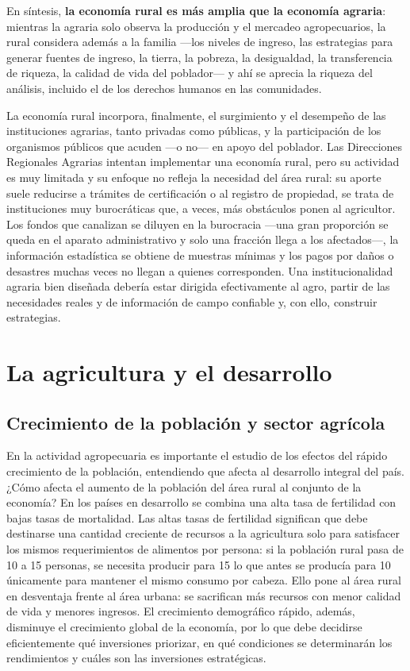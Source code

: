 \documentclass[
  man,
  floatsintext,
  longtable,
  a4paper,
  nolmodern,
  notxfonts,
  notimes,
  12pt,
  colorlinks=true,linkcolor=blue,citecolor=blue,urlcolor=blue]{apa7}
\begin{document}
En síntesis, \textbf{la economía rural es más amplia que la economía
agraria}: mientras la agraria solo observa la producción y el mercadeo
agropecuarios, la rural considera además a la familia ---los niveles de
ingreso, las estrategias para generar fuentes de ingreso, la tierra, la
pobreza, la desigualdad, la transferencia de riqueza, la calidad de vida
del poblador--- y ahí se aprecia la riqueza del análisis, incluido el de
los derechos humanos en las comunidades.

La economía rural incorpora, finalmente, el surgimiento y el desempeño
de las instituciones agrarias, tanto privadas como públicas, y la
participación de los organismos públicos que acuden ---o no--- en apoyo
del poblador. Las Direcciones Regionales Agrarias intentan implementar
una economía rural, pero su actividad es muy limitada y su enfoque no
refleja la necesidad del área rural: su aporte suele reducirse a
trámites de certificación o al registro de propiedad, se trata de
instituciones muy burocráticas que, a veces, más obstáculos ponen al
agricultor. Los fondos que canalizan se diluyen en la burocracia ---una
gran proporción se queda en el aparato administrativo y solo una
fracción llega a los afectados---, la información estadística se obtiene
de muestras mínimas y los pagos por daños o desastres muchas veces no
llegan a quienes corresponden. Una institucionalidad agraria bien
diseñada debería estar dirigida efectivamente al agro, partir de las
necesidades reales y de información de campo confiable y, con ello,
construir estrategias.

\section{La agricultura y el
desarrollo}\label{la-agricultura-y-el-desarrollo}

\subsection{Crecimiento de la población y sector
agrícola}\label{crecimiento-de-la-poblaciuxf3n-y-sector-agruxedcola}

En la actividad agropecuaria es importante el estudio de los efectos del
rápido crecimiento de la población, entendiendo que afecta al desarrollo
integral del país. ¿Cómo afecta el aumento de la población del área
rural al conjunto de la economía? En los países en desarrollo se combina
una alta tasa de fertilidad con bajas tasas de mortalidad. Las altas
tasas de fertilidad significan que debe destinarse una cantidad
creciente de recursos a la agricultura solo para satisfacer los mismos
requerimientos de alimentos por persona: si la población rural pasa de
10 a 15 personas, se necesita producir para 15 lo que antes se producía
para 10 únicamente para mantener el mismo consumo por cabeza. Ello pone
al área rural en desventaja frente al área urbana: se sacrifican más
recursos con menor calidad de vida y menores ingresos. El crecimiento
demográfico rápido, además, disminuye el crecimiento global de la
economía, por lo que debe decidirse eficientemente qué inversiones
priorizar, en qué condiciones se determinarán los rendimientos y cuáles
son las inversiones estratégicas.
\end{document}

